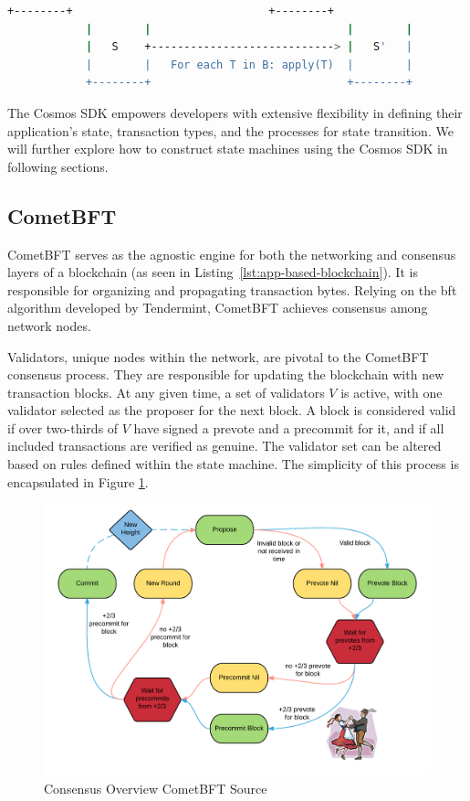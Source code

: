 \begin{lstlisting}[language=bash, caption=Block of bundled transactions. Source:\cite{app-based-blockchain},label={lst:state-block-transition}]
            +--------+                              +--------+
            |        |                              |        |
            |   S    +----------------------------> |   S'   |
            |        |   For each T in B: apply(T)  |        |
            +--------+                              +--------+
\end{lstlisting}

The Cosmos SDK empowers developers with extensive flexibility in defining their application's state, transaction types, and the processes for state transition. We will further explore how to construct state machines using the Cosmos SDK in following sections.

\subsection{CometBFT}

CometBFT serves as the agnostic engine for both the networking and consensus layers of a blockchain (as seen in Listing~\ref{lst:app-based-blockchain}). It is responsible for organizing and propagating transaction bytes. Relying on the \gls{bft} algorithm developed by Tendermint, CometBFT achieves consensus among network nodes.

Validators, unique nodes within the network, are pivotal to the CometBFT consensus process. They are responsible for updating the blockchain with new transaction blocks. At any given time, a set of validators \(V\) is active, with one validator selected as the proposer for the next block. A block is considered valid if over two-thirds of \(V\) have signed a prevote and a precommit for it, and if all included transactions are verified as genuine. The validator set can be altered based on rules defined within the state machine. The simplicity of this process is encapsulated in Figure \ref{fig:cometbft-overview}.

\begin{figure}[H]
    \centering
    \includegraphics[width=\textwidth]{figures/cometbft.png}
    \caption{Consensus Overview CometBFT Source\cite{cometbft-overview}}
    \label{fig:cometbft-overview}
\end{figure}

